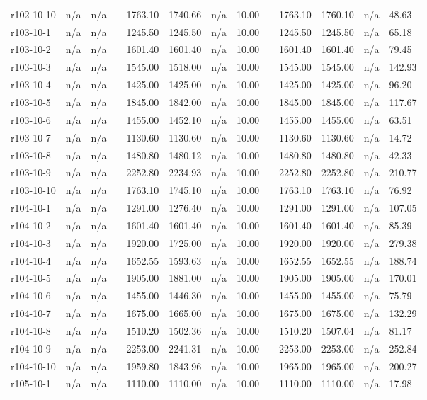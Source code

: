 \documentclass[final,5p,times,twocolumn]{elsarticle}
\begin{document}
{{{{{{{{{{{{{\begin{longtable}{l l l l l l l l l l l l l}
r102-10-10& n/a& n/a&&1763.10& 1740.66& n/a& 10.00&&1763.10& 1760.10& n/a& 48.63\\
r103-10-1& n/a& n/a&&1245.50& 1245.50& n/a& 10.00&&1245.50& 1245.50& n/a& 65.18\\
r103-10-2& n/a& n/a&&1601.40& 1601.40& n/a& 10.00&&1601.40& 1601.40& n/a& 79.45\\
r103-10-3& n/a& n/a&&1545.00& 1518.00& n/a& 10.00&&1545.00& 1545.00& n/a& 142.93\\
r103-10-4& n/a& n/a&&1425.00& 1425.00& n/a& 10.00&&1425.00& 1425.00& n/a& 96.20\\
r103-10-5& n/a& n/a&&1845.00& 1842.00& n/a& 10.00&&1845.00& 1845.00& n/a& 117.67\\
r103-10-6& n/a& n/a&&1455.00& 1452.10& n/a& 10.00&&1455.00& 1455.00& n/a& 63.51\\
r103-10-7& n/a& n/a&&1130.60& 1130.60& n/a& 10.00&&1130.60& 1130.60& n/a& 14.72\\
r103-10-8& n/a& n/a&&1480.80& 1480.12& n/a& 10.00&&1480.80& 1480.80& n/a& 42.33\\
r103-10-9& n/a& n/a&&2252.80& 2234.93& n/a& 10.00&&2252.80& 2252.80& n/a& 210.77\\
r103-10-10& n/a& n/a&&1763.10& 1745.10& n/a& 10.00&&1763.10& 1763.10& n/a& 76.92\\
r104-10-1& n/a& n/a&&1291.00& 1276.40& n/a& 10.00&&1291.00& 1291.00& n/a& 107.05\\
r104-10-2& n/a& n/a&&1601.40& 1601.40& n/a& 10.00&&1601.40& 1601.40& n/a& 85.39\\
r104-10-3& n/a& n/a&&1920.00& 1725.00& n/a& 10.00&&1920.00& 1920.00& n/a& 279.38\\
r104-10-4& n/a& n/a&&1652.55& 1593.63& n/a& 10.00&&1652.55& 1652.55& n/a& 188.74\\
r104-10-5& n/a& n/a&&1905.00& 1881.00& n/a& 10.00&&1905.00& 1905.00& n/a& 170.01\\
r104-10-6& n/a& n/a&&1455.00& 1446.30& n/a& 10.00&&1455.00& 1455.00& n/a& 75.79\\
r104-10-7& n/a& n/a&&1675.00& 1665.00& n/a& 10.00&&1675.00& 1675.00& n/a& 132.29\\
r104-10-8& n/a& n/a&&1510.20& 1502.36& n/a& 10.00&&1510.20& 1507.04& n/a& 81.17\\
r104-10-9& n/a& n/a&&2253.00& 2241.31& n/a& 10.00&&2253.00& 2253.00& n/a& 252.84\\
r104-10-10& n/a& n/a&&1959.80& 1843.96& n/a& 10.00&&1965.00& 1965.00& n/a& 200.27\\
r105-10-1& n/a& n/a&&1110.00& 1110.00& n/a& 10.00&&1110.00& 1110.00& n/a& 17.98\\

\end{longtable}}}}}}}}}}}}}}
\end{document}

